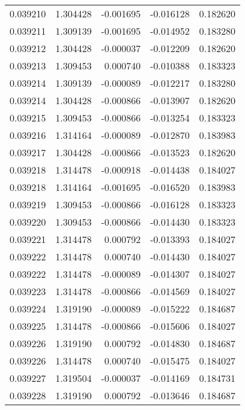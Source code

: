 \begin{tabular}{lrrrr}
0.039210    &  1.304428 & -0.001695 & -0.016128 &             0.182620 \\
0.039211    &  1.309139 & -0.001695 & -0.014952 &             0.183280 \\
0.039212    &  1.304428 & -0.000037 & -0.012209 &             0.182620 \\
0.039213    &  1.309453 &  0.000740 & -0.010388 &             0.183323 \\
0.039214    &  1.309139 & -0.000089 & -0.012217 &             0.183280 \\
0.039214    &  1.304428 & -0.000866 & -0.013907 &             0.182620 \\
0.039215    &  1.309453 & -0.000866 & -0.013254 &             0.183323 \\
0.039216    &  1.314164 & -0.000089 & -0.012870 &             0.183983 \\
0.039217    &  1.304428 & -0.000866 & -0.013523 &             0.182620 \\
0.039218    &  1.314478 & -0.000918 & -0.014438 &             0.184027 \\
0.039218    &  1.314164 & -0.001695 & -0.016520 &             0.183983 \\
0.039219    &  1.309453 & -0.000866 & -0.016128 &             0.183323 \\
0.039220    &  1.309453 & -0.000866 & -0.014430 &             0.183323 \\
0.039221    &  1.314478 &  0.000792 & -0.013393 &             0.184027 \\
0.039222    &  1.314478 &  0.000740 & -0.014430 &             0.184027 \\
0.039222    &  1.314478 & -0.000089 & -0.014307 &             0.184027 \\
0.039223    &  1.314478 & -0.000866 & -0.014569 &             0.184027 \\
0.039224    &  1.319190 & -0.000089 & -0.015222 &             0.184687 \\
0.039225    &  1.314478 & -0.000866 & -0.015606 &             0.184027 \\
0.039226    &  1.319190 &  0.000792 & -0.014830 &             0.184687 \\
0.039226    &  1.314478 &  0.000740 & -0.015475 &             0.184027 \\
0.039227    &  1.319504 & -0.000037 & -0.014169 &             0.184731 \\
0.039228    &  1.319190 &  0.000792 & -0.013646 &             0.184687 \\

\end{tabular}
